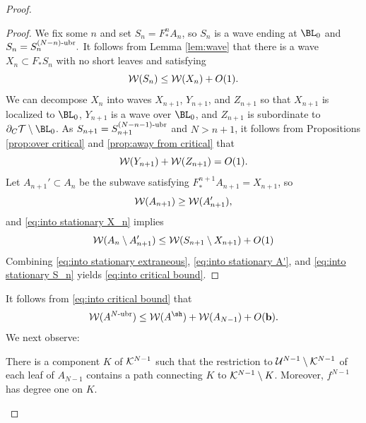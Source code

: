 \documentclass[12pt]{amsart}
\begin{document}
\begin{proof}
    \begin{proof}
        We fix some $n$ and set $S_n = F_*^nA_n$, so $S_n$ is a wave ending at $\BL_0$ and $S_n = S_n^{(N-n)\text{-}{\mathrm{ubr}}}.$
	It follows from Lemma \ref{lem:wave} that there is a wave $X_n\subset F_*S_n$ with no short leaves and satisfying
	\begin{equation}\label{eq:into stationary X_n}
		\mathcal W(S_{n})\leq \mathcal W(X_{n})+O(1).
	\end{equation}
	We can decompose $X_n$ into waves $X_{n+1}$, $Y_{n+1}$, and $Z_{n+1}$ so that 
	$X_{n+1}$ is localized to $\BL_0$, $Y_{n+1}$ is a wave over $\BL_0$, and $Z_{n+1}$ is subordinate to $\dcara\TT\sm\BL_0$. As $S_{n+1} = S_{n+1}^{(N-n-1)\text{-}{\mathrm{ubr}}}$ and $N> n+1$, it follows from Propositions \ref{prop:over critical} and \ref{prop:away from critical} that 
	\begin{equation}\label{eq:into stationary extraneous}
		\mathcal W(Y_{n+1})+ \mathcal W(Z_{n+1})= O(1).
	\end{equation}
	Let $A_{n+1}'\subset A_n$ be the subwave satisfying $F_*^{n+1}A_{n+1} = X_{n+1}$, 
	so 
	\begin{equation}\label{eq:into stationary A'}
		\mathcal W(A_{n+1})\geq \mathcal W(A_{n+1}'),
	\end{equation}
	and \eqref{eq:into stationary X_n} implies
	\begin{equation}\label{eq:into stationary S_n}
		\mathcal W(A_n\setminus A_{n+1}')\leq \mathcal W(S_{n+1}	
		\setminus X_{n+1})+O(1)
	\end{equation}
	Combining \eqref{eq:into stationary extraneous}, \eqref{eq:into stationary A'}, and \eqref{eq:into stationary S_n} yields \eqref{eq:into critical bound}.
    \end{proof}
    
    
      
	
	
	It follows from \eqref{eq:into critical bound}  that 
    \begin{equation}\label{eq:stationary A_N}
        \WW(A^{N\mathhyphen\nbr})\leq \WW(A^\sh)+\WW(A_{N-1})+O(\bound).
    \end{equation}
    We next observe:
    \begin{lemma}\label{lem:stationary wave alignment}
        There is a component $K$ of $\mathcal K^{N-1}$ such that the restriction to $\mathcal U^{N-1}\setminus \mathcal K^{N-1}$ of each leaf of $A_{N-1}$ contains a path connecting $K$ to $\mathcal K^{N-1}\setminus K$.
        Moreover, $f^{N-1}$ has degree one on $K$. 
    \end{lemma}


\end{proof}
\end{document}
